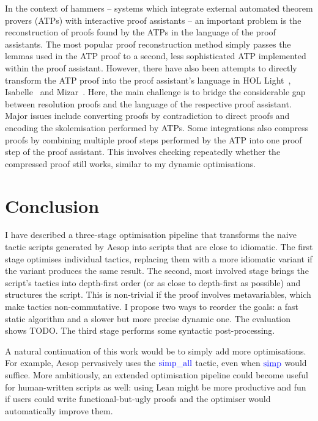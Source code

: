 \documentclass[sigplan,10pt,anonymous,review]{acmart}
\newcommand{\tac}[1]{\ensuremath{\mathrm{\mathcolor{blue}{#1}}}}
\begin{document}
In the context of hammers -- systems which integrate external automated theorem provers (ATPs) with interactive proof assistants -- an important problem is the reconstruction of proofs found by the ATPs in the language of the proof assistants.
The most popular proof reconstruction method simply passes the lemmas used in the ATP proof to a second, less sophisticated ATP implemented within the proof assistant.
However, there have also been attempts to directly transform the ATP proof into the proof assistant's language in HOL Light~\cite{PRocH}, Isabelle~\cite{Paulson2007,Blanchette2013a,Blanchette2013b,Blanchette2016} and Mizar~\cite{ATPMizar,MizarATP}.
Here, the main challenge is to bridge the considerable gap between resolution proofs and the language of the respective proof assistant.
Major issues include converting proofs by contradiction to direct proofs and encoding the skolemisation performed by ATPs.
Some integrations also compress proofs by combining multiple proof steps performed by the ATP into one proof step of the proof assistant.
This involves checking repeatedly whether the compressed proof still works, similar to my dynamic optimisations.

\section{Conclusion}%
\label{sec:concl}

I have described a three-stage optimisation pipeline that transforms the naive tactic scripts generated by Aesop into scripts that are close to idiomatic.
The first stage optimises individual tactics, replacing them with a more idiomatic variant if the variant produces the same result.
The second, most involved stage brings the script's tactics into depth-first order (or as close to depth-first as possible) and structures the script.
This is non-trivial if the proof involves metavariables, which make tactics non-commutative.
I propose two ways to reorder the goals: a fast static algorithm and a slower but more precise dynamic one.
The evaluation shows TODO.
The third stage performs some syntactic post-processing.

A natural continuation of this work would be to simply add more optimisations.
For example, Aesop pervasively uses the \tac{simp\_all} tactic, even when \tac{simp} would suffice.
More ambitiously, an extended optimisation pipeline could become useful for human-written scripts as well:
using Lean might be more productive and fun if users could write functional-but-ugly proofs and the optimiser would automatically improve them.



\end{document}
